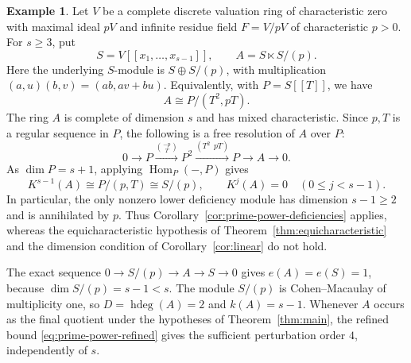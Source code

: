 \documentclass[11pt,reqno]{amsart}
\numberwithin{equation}{section}
\theoremstyle{definition}
\newtheorem{example}[theorem]{Example}
\newcommand{\hdeg}{\operatorname{hdeg}}
\begin{document}
\begin{example}
\label{ex:mixed-characteristic-linear}
Let $V$ be a complete discrete valuation ring of characteristic
zero with maximal ideal $pV$ and infinite residue field
$F=V/pV$ of characteristic $p>0$. For $s\ge3$, put
\[
 S=V[[x_1,\ldots,x_{s-1}]],\qquad A=S\ltimes S/(p).
\]
Here the underlying $S$-module is $S\oplus S/(p)$, with
multiplication $(a,u)(b,v)=(ab,av+bu)$. Equivalently, with
$P=S[[T]]$, we have
\[
 A\cong P/(T^2,pT).
\]
The ring $A$ is complete of dimension $s$ and has mixed
characteristic. Since $p,T$ is a regular sequence in $P$, the
following is a free resolution of $A$ over $P$:
\[
 0\longrightarrow P
 \xrightarrow{\binom{-p}{T}}P^2
 \xrightarrow{(T^2\ \ pT)}P
 \longrightarrow A\longrightarrow0.
\]
As $\dim P=s+1$, applying $\operatorname{Hom}_P(-,P)$ gives
\[
 K^{s-1}(A)\cong P/(p,T)\cong S/(p),\qquad
 K^j(A)=0\quad(0\le j<s-1).
\]
In particular, the only nonzero lower deficiency module has
dimension $s-1\ge2$ and is annihilated by $p$.
Thus Corollary~\ref{cor:prime-power-deficiencies} applies, whereas
the equicharacteristic hypothesis of
Theorem~\ref{thm:equicharacteristic} and the dimension condition
of Corollary~\ref{cor:linear} do not hold.

The exact sequence $0\to S/(p)\to A\to S\to0$ gives
$e(A)=e(S)=1$, because $\dim S/(p)=s-1<s$.
The module $S/(p)$ is Cohen--Macaulay of multiplicity one, so
$D=\hdeg(A)=2$ and $k(A)=s-1$.
Whenever $A$ occurs as the final quotient under the hypotheses
of Theorem~\ref{thm:main}, the refined bound
\eqref{eq:prime-power-refined} gives the sufficient perturbation
order $4$, independently of $s$.
\end{example}
\end{document}
